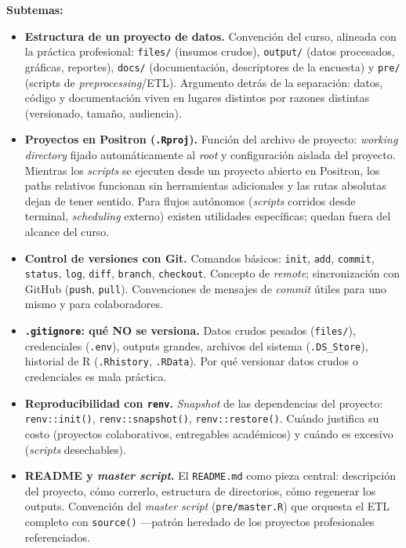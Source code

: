 \documentclass[11pt,letterpaper]{article}
\begin{document}
\textbf{Subtemas:}

\begin{itemize}[leftmargin=*, itemsep=2pt]
    \item \textbf{Estructura de un proyecto de datos.} Convención del curso, alineada con la práctica profesional: \texttt{files/} (insumos crudos), \texttt{output/} (datos procesados, gráficas, reportes), \texttt{docs/} (documentación, descriptores de la encuesta) y \texttt{pre/} (scripts de \textit{preprocessing}/ETL). Argumento detrás de la separación: datos, código y documentación viven en lugares distintos por razones distintas (versionado, tamaño, audiencia).
    \item \textbf{Proyectos en Positron (\texttt{.Rproj}).} Función del archivo de proyecto: \textit{working directory} fijado automáticamente al \textit{root} y configuración aislada del proyecto. Mientras los \textit{scripts} se ejecuten desde un proyecto abierto en Positron, los paths relativos funcionan sin herramientas adicionales y las rutas absolutas dejan de tener sentido. Para flujos autónomos (\textit{scripts} corridos desde terminal, \textit{scheduling} externo) existen utilidades específicas; quedan fuera del alcance del curso.
    \item \textbf{Control de versiones con Git.} Comandos básicos: \texttt{init}, \texttt{add}, \texttt{commit}, \texttt{status}, \texttt{log}, \texttt{diff}, \texttt{branch}, \texttt{checkout}. Concepto de \textit{remote}; sincronización con GitHub (\texttt{push}, \texttt{pull}). Convenciones de mensajes de \textit{commit} útiles para uno mismo y para colaboradores.
    \item \textbf{\texttt{.gitignore}: qué NO se versiona.} Datos crudos pesados (\texttt{files/}), credenciales (\texttt{.env}), outputs grandes, archivos del sistema (\texttt{.DS\_Store}), historial de R (\texttt{.Rhistory}, \texttt{.RData}). Por qué versionar datos crudos o credenciales es mala práctica.
    \item \textbf{Reproducibilidad con \texttt{renv}.} \textit{Snapshot} de las dependencias del proyecto: \texttt{renv::init()}, \texttt{renv::snapshot()}, \texttt{renv::restore()}. Cuándo justifica su costo (proyectos colaborativos, entregables académicos) y cuándo es excesivo (\textit{scripts} desechables).
    \item \textbf{README y \textit{master script}.} El \texttt{README.md} como pieza central: descripción del proyecto, cómo correrlo, estructura de directorios, cómo regenerar los outputs. Convención del \textit{master script} (\texttt{pre/master.R}) que orquesta el ETL completo con \texttt{source()} ---patrón heredado de los proyectos profesionales referenciados.
\end{itemize}
\end{document}
